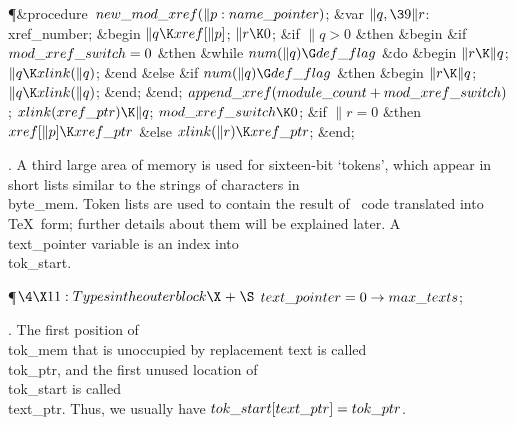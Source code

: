 \Y\P\4\&{procedure}\1\  $\\{new\_mod\_xref}(\|p:\\{name\_pointer})$;\6
\4\&{var} $\|q,\39\|r$: \\{xref\_number};\2\6
\&{begin} $\|q\K\\{xref}[\|p]$;\5
$\|r\K0$;\6
\&{if} $\|q>0$ \1\&{then}\6
\&{begin} \&{if} $\\{mod\_xref\_switch}=0$ \1\&{then}\6
\&{while} $\\{num}(\|q)\G\\{def\_flag}$ \1\&{do}\6
\&{begin} $\|r\K\|q$;\5
$\|q\K\\{xlink}(\|q)$;\6
\&{end}\2\6
\4\&{else} \&{if} $\\{num}(\|q)\G\\{def\_flag}$ \1\&{then}\6
\&{begin} $\|r\K\|q$;\5
$\|q\K\\{xlink}(\|q)$;\6
\&{end};\2\2\6
\&{end};\2\6
$\\{append\_xref}(\\{module\_count}+\\{mod\_xref\_switch})$;\5
$\\{xlink}(\\{xref\_ptr})\K\|q$;\5
$\\{mod\_xref\_switch}\K0$;\6
\&{if} $\|r=0$ \1\&{then}\5
$\\{xref}[\|p]\K\\{xref\_ptr}$\6
\4\&{else} $\\{xlink}(\|r)\K\\{xref\_ptr}$;\2\6
\&{end};\par
\fi

. A third large area of memory is used for sixteen-bit `tokens', which
appear
in short lists similar to the strings of characters in \\{byte\_mem}. Token
lists
are used to contain the result of \PASCAL\ code translated into \TeX\ form;
further details about them will be explained later. A \\{text\_pointer}
variable
is an index into \\{tok\_start}.

\Y\P$\4\X11:Types in the outer block\X\mathrel{+}\S$\6
$\\{text\_pointer}=0\to\\{max\_texts}$;\par
\fi

. The first position of \\{tok\_mem}
that is unoccupied by replacement text is called \\{tok\_ptr}, and the first
unused location of \\{tok\_start} is called \\{text\_ptr}.
Thus, we usually have $\\{tok\_start}[\\{text\_ptr}]=\\{tok\_ptr}$.

